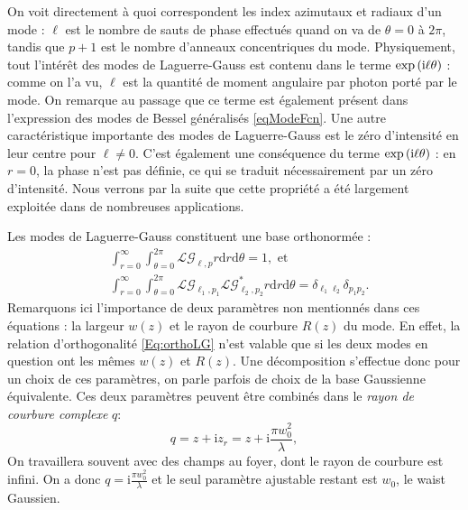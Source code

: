 On voit directement à quoi correspondent les index azimutaux et radiaux d'un mode : $\ell$ est le nombre de sauts de phase effectués quand on va de $\theta = 0$ à $2\pi$, tandis que $p+1$ est le nombre d'anneaux concentriques du mode. Physiquement, tout l'intérêt des modes de Laguerre-Gauss est contenu dans le terme $\exp{({\mathrm{i}}\ell \theta )}$ : comme on l'a vu, $\ell$ est la quantité de moment angulaire par photon porté par le mode. On remarque au passage que ce terme est également présent dans l'expression des modes de Bessel généralisés \ref{eqModeFcn}. Une autre caractéristique importante des modes de Laguerre-Gauss est le zéro d'intensité en leur centre pour $\ell \neq 0$. C'est également une conséquence du terme $\exp{({\mathrm{i}}\ell \theta )}$ : en $r=0$, la phase n'est pas définie, ce qui se traduit nécessairement par un zéro d'intensité. Nous verrons par la suite que cette propriété a été largement exploitée dans de nombreuses applications. 

Les modes de Laguerre-Gauss constituent une base orthonormée : 
\begin{align}
&\int_{r=0}^{\infty}\int_{\theta=0}^{2\pi}{\mathcal{LG}_{\ell,p} r\mathrm{d}r\mathrm{d}\theta} = 1, \mbox{ et}\nonumber\\ 
&\int_{r=0}^{\infty}\int_{\theta=0}^{2\pi}{\mathcal{LG}_{\ell_1,p_1} \mathcal{LG}^{*}_{\ell_2,p_2} r\mathrm{d}r\mathrm{d}\theta} = \delta_{\ell_1\ell_2}\delta_{p_1p_2}.
\label{Eq:orthoLG}
\end{align}
Remarquons ici l'importance de deux paramètres non mentionnés dans ces équations : la largeur $w(z)$ et le rayon de courbure $R(z)$ du mode. En effet, la relation d'orthogonalité \ref{Eq:orthoLG} n'est valable que si les deux modes en question ont les mêmes $w(z)$ et $R(z)$. Une décomposition s'effectue donc pour un choix de ces paramètres, on parle parfois de choix de la base Gaussienne équivalente. Ces deux paramètres peuvent être combinés dans le \textit{rayon de courbure complexe} $q$:
\begin{equation*}
q = z + \mathrm{i}z_r = z + \mathrm{i}\frac{\pi w_0^2}{\lambda},
\end{equation*}
On travaillera souvent avec des champs au foyer, dont le rayon de courbure est infini. On a donc $q = \mathrm{i}\frac{\pi w_0^2}{\lambda}$ et le seul paramètre ajustable restant est $w_0$, le waist Gaussien.

